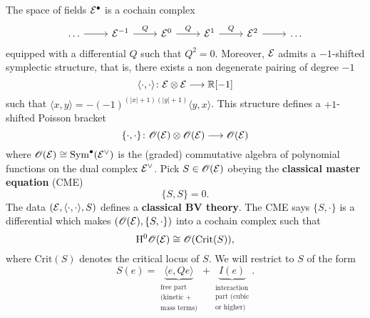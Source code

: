 The space of fields $\mathcal{E}^\bullet$ is a cochain complex
\begin{equation*}
  \begin{tikzcd}
    \dots \arrow[r] &
    \Ecal^{-1} \arrow[r, "Q"] &
    \Ecal^0 \arrow[r, "Q"] &
    \Ecal^1 \arrow[r, "Q"] &
    \Ecal^2 \arrow[r] &
    \dots
  \end{tikzcd}
\end{equation*}
equipped with a differential $Q$ such that $Q^2 = 0$. Moreover, $\mathcal{E}$ admits a $-1$-shifted symplectic structure, that is, there exists a non degenerate pairing of degree $-1$
\begin{equation*}
  \langle \cdot , \cdot \rangle \colon
  \mathcal{E} \otimes \mathcal{E} \longrightarrow \mathbb{R} [-1]
\end{equation*}
such that $\langle x, y \rangle = -(-1)^{(|x|+1)(|y|+1)} \langle y, x \rangle$.
This structure defines a $+1$-shifted Poisson bracket
\begin{equation*}
  \{ \cdot, \cdot \} \colon
  \mathscr{O}( \mathcal{E} ) \otimes \mathscr{O}( \mathcal{E} ) \longrightarrow \mathscr{O}( \mathcal{E} )
\end{equation*}
where $\mathscr{O} ( \mathcal{E} ) \cong \mathrm{Sym}^\bullet (\mathcal{E}^\vee)$ is the (graded) commutative algebra of polynomial functions on the dual complex $\mathcal{E}^\vee$.
Pick $S \in \mathscr{O} (\mathcal{E})$ obeying the \textbf{classical master equation} (CME)
\begin{equation*}
  \{ S, S \} = 0.
\end{equation*}
The data $(\mathcal{E}, \langle \cdot, \cdot \rangle, S)$ defines a \textbf{classical BV theory}. The CME says $\{ S, \cdot \}$ is a differential which makes $(\mathscr{O} ( \mathcal{E} ), \{S, \cdot \} )$ into a cochain complex such that
\begin{equation*}
  \mathrm{H}^0 \mathscr{O} ( \mathcal{E} ) \cong
  \mathscr{O}( \mathrm{Crit} (S) ),
\end{equation*}
where $\mathrm{Crit} (S)$ denotes the critical locus of $S$.
We will restrict to $S$ of the form
\begin{equation*}
S(e) = \underbrace{\langle e, Qe \rangle}_{\substack{ \text{free part} \\ \text{(kinetic +} \\ \text{mass terms)} }}
+ \underbrace{I(e)}_{\substack{ \text{interaction} \\ \text{part (cubic} \\ \text{or higher)} }}.
\end{equation*}

